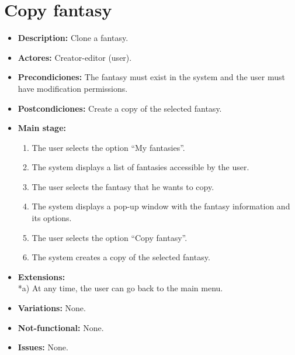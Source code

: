 \section{Copy fantasy}
\begin{itemize}
	\item \textbf{Description:} Clone a fantasy.
	\item \textbf{Actores:} Creator-editor (user).
	\item \textbf{Precondiciones:} The fantasy must exist in the system and the user must have modification permissions.
	\item \textbf{Postcondiciones:} Create a copy of the selected fantasy.
	\item \textbf{Main stage:}
	\begin{enumerate}
		\item The user selects the option ``My fantasies''.
		\item The system displays a list of fantasies accessible by the user.
		\item The user selects the fantasy that he wants to copy.
		\item The system displays a pop-up window with the fantasy information and its options.
		\item The user selects the option ``Copy fantasy''.
		\item The system creates a copy of the selected fantasy.
	\end{enumerate}
	\item \textbf{Extensions:} \\ *a) At any time, the user can go back to the main menu.
	\item \textbf{Variations:} None.
	\item \textbf{Not-functional:} None.
	\item \textbf{Issues:} None.
\end{itemize}

